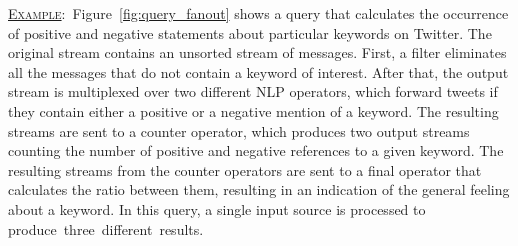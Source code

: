 \underline{\textsc{Example}}:~Figure~\ref{fig:query_fanout} shows a query that calculates the occurrence
of positive and negative statements about particular keywords on Twitter. 
The original stream contains an unsorted stream of messages. First, a filter eliminates all the
messages that do not contain a keyword of interest. After that, the output stream is multiplexed over
two different NLP operators, which forward tweets if they contain
either a positive or a negative mention of a keyword. The resulting streams are sent to a counter
operator, which produces two output streams counting the number of positive and negative references to
a given keyword. The resulting streams from the counter operators are sent to a final operator that
calculates the ratio between them, resulting in an indication of the general feeling about a
keyword. In this query, a single input source is processed to produce~three~different~results.

 

